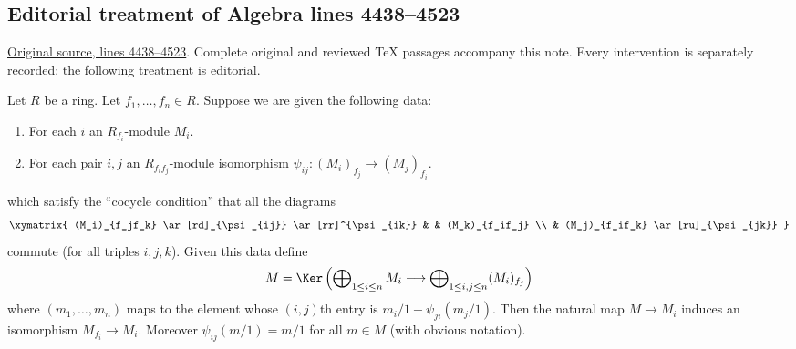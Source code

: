 \subsection{Editorial treatment of Algebra lines 4438--4523}

\hypertarget{algebra-context-022}{}

\noindent\href{https://github.com/stacks/stacks-project/blob/a04446e57ec1fbc252a871afcec7752fb2807b14/algebra.tex\#L4438}{Original source, lines 4438--4523}. Complete original and reviewed TeX passages accompany this note. Every intervention is separately recorded; the following treatment is editorial.


\begin{lemma}
\label{editorial-source-lemma-glue-modules}
Let $R$ be a ring. Let $f_1, \ldots, f_n \in R$. Suppose we are given
the following data:
\begin{enumerate}
\item For each $i$ an $R_{f_i}$-module $M_i$.
\item For each pair $i, j$ an $R_{f_if_j}$-module isomorphism
$\psi_{ij} : (M_i)_{f_j} \to (M_j)_{f_i}$.
\end{enumerate}
which satisfy the ``cocycle condition'' that all the diagrams
$$
\xymatrix{
(M_i)_{f_jf_k}
\ar[rd]_{\psi_{ij}}
\ar[rr]^{\psi_{ik}}
& &
(M_k)_{f_if_j} \\
&
(M_j)_{f_if_k} \ar[ru]_{\psi_{jk}}
}
$$
commute (for all triples $i, j, k$). Given this data define
$$
M = \Ker\left(
\bigoplus\nolimits_{1 \leq i \leq n} M_i
\longrightarrow
\bigoplus\nolimits_{1 \leq i, j \leq n} (M_i)_{f_j}
\right)
$$
where $(m_1, \ldots, m_n)$ maps to the element whose
$(i, j)$th entry is $m_i/1 - \psi_{ji}(m_j/1)$.
Then the natural map $M \to M_i$ induces an isomorphism
$M_{f_i} \to M_i$. Moreover $\psi_{ij}(m/1) = m/1$
for all $m \in M$ (with obvious notation).
\end{lemma}


